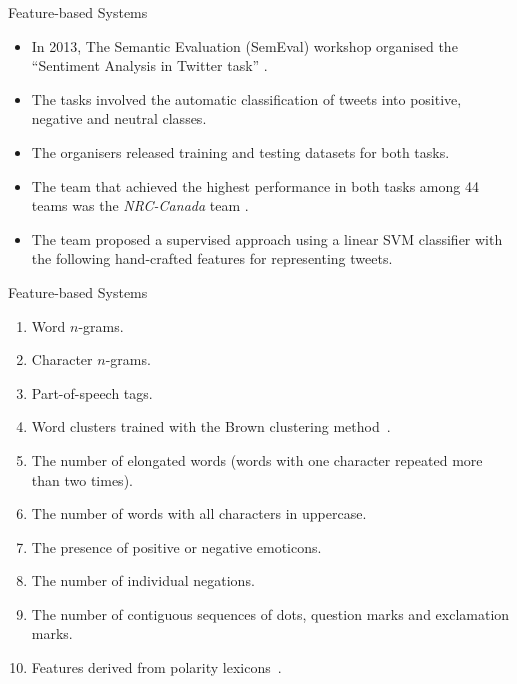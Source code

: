 \documentclass[handout]{beamer}
\begin{document}
\begin{frame}{Feature-based Systems}
\begin{scriptsize}
\begin{itemize}
\item In 2013, The Semantic Evaluation (SemEval) workshop organised the
``Sentiment Analysis in Twitter
task'' \cite{Semeval2013}.
 \item The tasks involved the automatic classification of tweets into positive, negative and neutral classes.
\item  The organisers released training and testing datasets
for both tasks.
\cite{Semeval2013}

\item The team that achieved the highest performance in both
tasks among 44 teams was the \emph{NRC-Canada} team
\cite{Mohammad2013}.  
\item The team proposed a supervised approach using a linear SVM
classifier with the following hand-crafted features for representing tweets.

\end{itemize}
\end{scriptsize}
\end{frame}



\begin{frame}{Feature-based Systems}
\begin{scriptsize}
\begin{enumerate}
\item  Word $n$-grams.
\item  Character $n$-grams. 
\item Part-of-speech tags.
\item Word clusters trained with the Brown clustering method~\cite{brown1992class}.
\item The number of elongated words (words with one character repeated more than two times).
\item The number of words with all characters in uppercase.
\item The presence of positive or negative emoticons.
\item The number of individual negations.
\item The number of contiguous sequences of dots, question marks and exclamation marks.
\item Features derived from polarity lexicons~\cite{Mohammad2013}. 
\end{enumerate}
\end{scriptsize} 
\end{frame}
\end{document}
